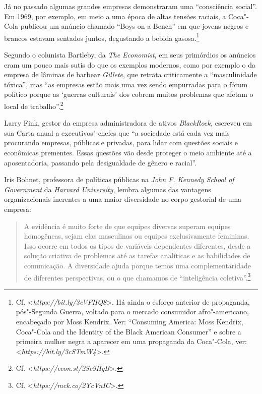 Já no passado algumas grandes empresas demonstraram uma ``consciência
social''. Em 1969, por exemplo, em meio a uma época de altas tensões
raciais, a Coca"-Cola publicou um anúncio chamado ``Boys on a Bench'' em
que jovens negros e brancos estavam sentados juntos, degustando a bebida
gasosa.\footnote{Cf.
  \textless{}\emph{https://bit.ly/3eVFHQ8}\textgreater{}.
  Há ainda o esforço anterior de propaganda, pós"-Segunda Guerra, voltado
  para o mercado consumidor afro"-americano, encabeçado por Moss Kendrix.
  Ver: ``Consuming America: Moss Kendrix, Coca"-Cola and the Identity of
  the Black American Consumer''
  e sobre a primeira mulher negra a aparecer em uma propaganda da
  Coca"-Cola, ver:
  \textless{}\emph{https://bit.ly/3cSTmW4}\textgreater{}.}

Segundo o colunista Bartleby, da \emph{The Economist}, em seus
primórdios os anúncios eram um pouco mais sutis do que os exemplos
modernos, como por exemplo o da empresa de lâminas de barbear
\emph{Gillete}, que retrata criticamente a ``masculinidade tóxica'', mas
``as empresas estão mais uma vez sendo empurradas para o fórum político
porque as `guerras culturais' dos  cobrem muitos problemas que afetam
o local de trabalho''.\footnote{Cf. \textless{}\emph{https://econ.st/2Sc9HgB}\textgreater{}.}

Larry Fink, gestor da empresa administradora de ativos \emph{BlackRock,}
escreveu em sua Carta anual a executivos"-chefes que ``a sociedade está
cada vez mais procurando empresas, públicas e privadas, para lidar com
questões sociais e econômicas prementes. Essas questões vão desde
proteger o meio ambiente até a aposentadoria, passando pela desigualdade
de gênero e racial''.

Iris Bohnet, professora de políticas públicas na \emph{John F. Kennedy
School of Government} da \emph{Harvard University}, lembra algumas das
vantagens organizacionais inerentes a uma maior diversidade no corpo
gestorial de uma empresa:

\begin{quote}
A evidência é muito forte de que equipes diversas superam equipes
homogêneas, sejam elas masculinas ou equipes exclusivamente femininas.
Isso ocorre em todos os tipos de variáveis dependentes diferentes, desde
a solução criativa de problemas até as tarefas analíticas e as
habilidades de comunicação. A diversidade ajuda porque temos uma
complementaridade de diferentes perspectivas, ou o que chamamos de
``inteligência coletiva''.\footnote{Cf. \textless{}\emph{https://mck.co/2YcVnIC}\textgreater{}.}
\end{quote}

